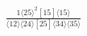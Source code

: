 \documentclass[varwidth, border=5pt]{standalone}
\begin{document}
\begin{my}
$\begin{gathered}
\scriptscriptstyle\frac{1⟨25⟩^2[15]⟨15⟩}{⟨12⟩⟨24⟩[25]⟨34⟩⟨35⟩}
\end{gathered}$
\end{my}
\end{document}
